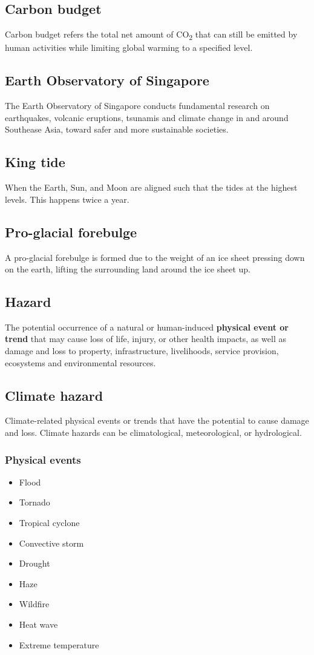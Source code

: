 \documentclass[11pt]{article}
\begin{document}
\subsection{Carbon budget}
\label{sec:orga202047}
Carbon budget refers the total net amount of CO\textsubscript{2} that can still be emitted by human activities while limiting global warming to a specified level.
\subsection{Earth Observatory of Singapore}
\label{sec:orgb2afa07}
The Earth Observatory of Singapore conducts fundamental research on earthquakes, volcanic eruptions, tsunamis and climate change in and around Southease Asia, toward safer and more sustainable societies.
\subsection{King tide}
\label{sec:org8168f0d}
When the Earth, Sun, and Moon are aligned such that the tides at the highest levels. This happens twice a year.
\subsection{Pro-glacial forebulge}
\label{sec:org0f5abaa}
A pro-glacial forebulge is formed due to the weight of an ice sheet pressing down on the earth, lifting the surrounding land around the ice sheet up.
\subsection{Hazard}
\label{sec:org1a51b73}
The potential occurrence of a natural or human-induced \textbf{physical event or trend} that may cause loss of life, injury, or other health impacts, as well as damage and loss to property, infrastructure, livelihoods, service provision, ecosystems and environmental resources.

\newpage
\subsection{Climate hazard}
\label{sec:org4c015f1}
Climate-related physical events or trends that have the potential to cause damage and loss. Climate hazards can be climatological, meteorological, or hydrological.
\subsubsection{Physical events}
\label{sec:org4e761d3}
\begin{itemize}
\item Flood
\item Tornado
\item Tropical cyclone
\item Convective storm
\item Drought
\item Haze
\item Wildfire
\item Heat wave
\item Extreme temperature
\end{itemize}
\end{document}
